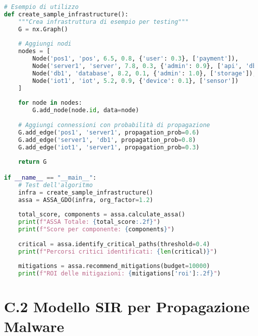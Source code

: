 \begin{lstlisting}[language=Python, caption=Implementazione dell'algoritmo ASSA-GDO]
# Esempio di utilizzo
def create_sample_infrastructure():
    """Crea infrastruttura di esempio per testing"""
    G = nx.Graph()
    
    # Aggiungi nodi
    nodes = [
        Node('pos1', 'pos', 6.5, 0.8, {'user': 0.3}, ['payment']),
        Node('server1', 'server', 7.8, 0.3, {'admin': 0.9}, ['api', 'db']),
        Node('db1', 'database', 8.2, 0.1, {'admin': 1.0}, ['storage']),
        Node('iot1', 'iot', 5.2, 0.9, {'device': 0.1}, ['sensor'])
    ]
    
    for node in nodes:
        G.add_node(node.id, data=node)
    
    # Aggiungi connessioni con probabilità di propagazione
    G.add_edge('pos1', 'server1', propagation_prob=0.6)
    G.add_edge('server1', 'db1', propagation_prob=0.8)
    G.add_edge('iot1', 'server1', propagation_prob=0.3)
    
    return G

if __name__ == "__main__":
    # Test dell'algoritmo
    infra = create_sample_infrastructure()
    assa = ASSA_GDO(infra, org_factor=1.2)
    
    total_score, components = assa.calculate_assa()
    print(f"ASSA Totale: {total_score:.2f}")
    print(f"Score per componente: {components}")
    
    critical = assa.identify_critical_paths(threshold=0.4)
    print(f"Percorsi critici identificati: {len(critical)}")
    
    mitigations = assa.recommend_mitigations(budget=10000)
    print(f"ROI delle mitigazioni: {mitigations['roi']:.2f}")
\end{lstlisting}

\section{C.2 Modello SIR per Propagazione Malware}

